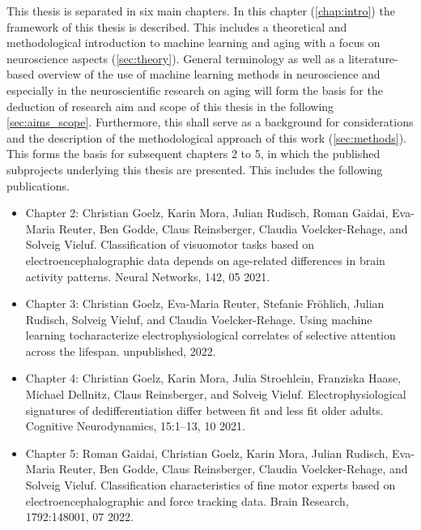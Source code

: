 This thesis is separated in six main chapters. In this chapter (\autoref{chap:intro}) the framework of this thesis is described. This includes a theoretical and methodological introduction to machine learning and aging with a focus on neuroscience aspects (\autoref{sec:theory}).  General terminology as well as a literature-based overview of the use of machine learning methods in neuroscience and especially in the neuroscientific research on aging will form the basis for the deduction of research aim and scope of this thesis in the following \autoref{sec:aims_scope}. Furthermore, this shall serve as a background for considerations and the description of the methodological approach of this work (\autoref{sec:methods}).\\
This forms the basis for subsequent chapters 2 to 5, in which the published subprojects underlying this thesis are presented. This includes the following publications.
\begin{itemize}
    \item Chapter 2: Christian Goelz, Karin Mora, Julian Rudisch, Roman Gaidai, Eva-Maria Reuter, Ben Godde, Claus Reinsberger, Claudia Voelcker-Rehage, and Solveig Vieluf. Classification of visuomotor tasks based on electroencephalographic data depends on age-related differences in brain activity patterns. Neural Networks, 142, 05 2021.
    \item Chapter 3: Christian Goelz, Eva-Maria Reuter, Stefanie Fröhlich, Julian Rudisch, Solveig Vieluf, and Claudia Voelcker-Rehage. Using machine learning tocharacterize electrophysiological correlates of selective attention across the lifespan. unpublished, 2022. 
    \item Chapter 4: Christian Goelz, Karin Mora, Julia Stroehlein, Franziska Haase, Michael Dellnitz, Claus Reinsberger, and Solveig Vieluf. Electrophysiological signatures of dedifferentiation differ between fit and less fit older adults. Cognitive Neurodynamics, 15:1–13, 10 2021.
    \item Chapter 5: Roman Gaidai, Christian Goelz, Karin Mora, Julian Rudisch, Eva-Maria Reuter, Ben Godde, Claus Reinsberger, Claudia Voelcker-Rehage, and Solveig Vieluf. Classification characteristics of fine motor experts based on electroencephalographic and force tracking data. Brain Research, 1792:148001, 07 2022.
\end{itemize}

